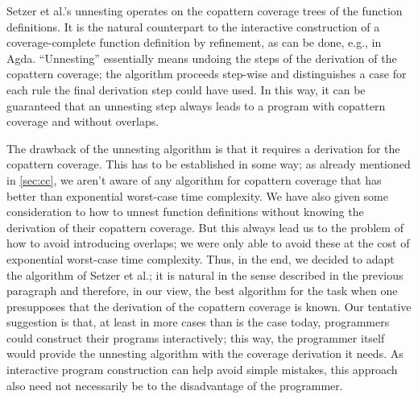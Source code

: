 Setzer et al.'s\cite{setzer14unnesting} unnesting operates on the copattern coverage trees of the function definitions. It is the natural counterpart to the interactive construction of a coverage-complete function definition by refinement, as can be done, e.g., in Agda. ``Unnesting'' essentially means undoing the steps of the derivation of the copattern coverage; the algorithm proceeds step-wise and distinguishes a case for each rule the final derivation step could have used. In this way, it can be guaranteed that an unnesting step always leads to a program with copattern coverage and without overlaps.

The drawback of the unnesting algorithm is that it requires a derivation for the copattern coverage. This has to be established in some way; as already mentioned in \autoref{sec:cc}, we aren't aware of any algorithm for copattern coverage that has better than exponential worst-case time complexity. We have also given some consideration to how to unnest function definitions without knowing the derivation of their copattern coverage. But this always lead us to the problem of how to avoid introducing overlaps; we were only able to avoid these at the cost of exponential worst-case time complexity. Thus, in the end, we decided to adapt the algorithm of Setzer et al.; it is natural in the sense described in the previous paragraph and therefore, in our view, the best algorithm for the task when one presupposes that the derivation of the copattern coverage is known. Our tentative suggestion is that, at least in more cases than is the case today, programmers could construct their programs interactively; this way, the programmer itself would provide the unnesting algorithm with the coverage derivation it needs. As interactive program construction can help avoid simple mistakes, this approach also need not necessarily be to the disadvantage of the programmer.

